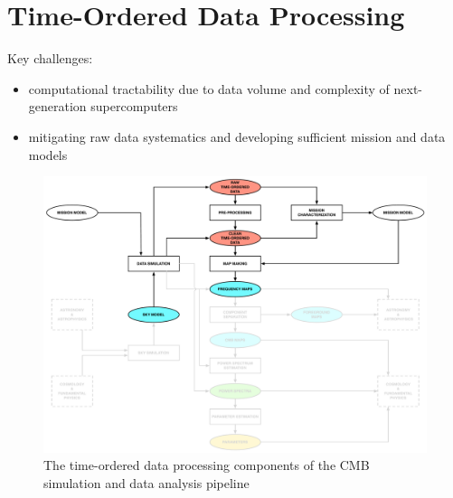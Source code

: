 
\section{Time-Ordered Data Processing}

Key challenges:
\begin{itemize}
\item computational tractability due to data volume and complexity of next-generation supercomputers
\item mitigating raw data systematics and developing sufficient mission and data models
\end{itemize}

\begin{figure}[htbp]
\centering
\includegraphics[width=1\textwidth]{Analysis/td}
\caption{The time-ordered data processing components of the CMB simulation and data analysis pipeline}
\label{default}

\end{figure}
%



